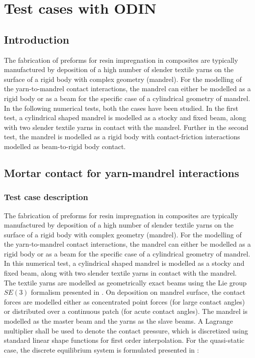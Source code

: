 \section{Test cases with ODIN}\label{sec:testcasesodin}
\subsection{Introduction}

The fabrication of preforms for resin impregnation in composites are typically manufactured by deposition of a high number of slender textile yarns on the surface of a rigid body with complex geometry (mandrel). For the modelling of the yarn-to-mandrel contact interactions, the mandrel can either be modelled as a rigid body or as a beam for the specific case of a cylindrical geometry of mandrel. In the following numerical tests, both the cases have been studied. In the first test, a cylindrical shaped mandrel is modelled as a stocky and fixed beam, along with two slender textile yarns in contact with the mandrel. Further in the second test, the mandrel is modelled as a rigid body with contact-friction interactions modelled as beam-to-rigid body contact.

\subsection{Mortar contact for yarn-mandrel interactions}
\subsubsection{Test case description}
The fabrication of preforms for resin impregnation in composites are typically manufactured by deposition of a high number of slender textile yarns on the surface of a rigid body with complex geometry (mandrel). For the modelling of the yarn-to-mandrel contact interactions, the mandrel can either be modelled as a rigid body or as a beam for the specific case of a cylindrical geometry of mandrel. In this numerical test, a cylindrical shaped mandrel is modelled as a stocky and fixed beam, along with two slender textile yarns in contact with the mandrel.\\
The textile yarns are modelled as geometrically exact beams using the Lie group $SE(3)$ formalism presented in \cite{sonneville2014geometrically}. On deposition on mandrel surface, the contact forces are modelled either as concentrated point forces (for large contact angles) or distributed over a continuous patch (for acute contact angles). The mandrel is modelled as the master beam and the yarns as the slave beams. A Lagrange multiplier shall be used to denote the contact pressure, which is discretized using standard linear shape functions for first order interpolation. For the quasi-static case, the discrete equilibrium system is formulated presented in \cite{bosten2022mortar}:

